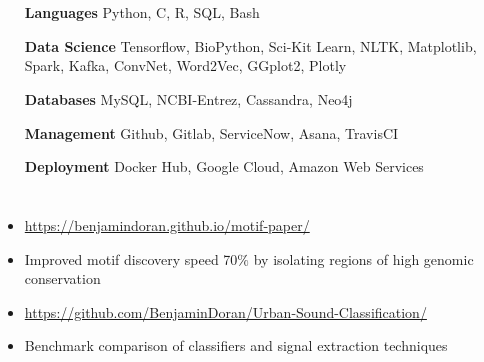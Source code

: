 \documentclass[hidelinks, 11pt]{article}
\begin{document}
\section*{}
\begin{addmargin}{1.7in}
  \begin{itemize}\setlength\itemsep{-4pt}
    \item[{\bf Languages}]{Python, C, R, SQL, Bash}
    \item[{\bf Data Science}]{Tensorflow, BioPython, Sci-Kit Learn, NLTK, Matplotlib, 
                              Spark, Kafka, ConvNet, Word2Vec, GGplot2, Plotly}
    \item[{\bf Databases}]{MySQL, NCBI-Entrez, Cassandra, Neo4j}
    \item[{\bf Management}]{Github, Gitlab, ServiceNow, Asana, TravisCI}
    \item[{\bf Deployment}]{Docker Hub, Google Cloud, Amazon Web Services}
  \end{itemize}
\end{addmargin}
\vspace{-6pt}

\section*{}
\begin{addmargin}{.5in}
  \begin{itemize}\setlength\itemsep{-4pt}
    \item{\color{blue}\url{https://benjamindoran.github.io/motif-paper/}}
    \item{Improved motif discovery speed 70$\%$ by isolating regions of high genomic conservation} 
  \end{itemize}
  \begin{itemize}\setlength\itemsep{-4pt}
    \item{\color{blue}\url{https://github.com/BenjaminDoran/Urban-Sound-Classification/}}
    \item{Benchmark comparison of classifiers and signal extraction techniques} 
  \end{itemize}
\end{addmargin}
\vspace{-6pt}
\end{document}
